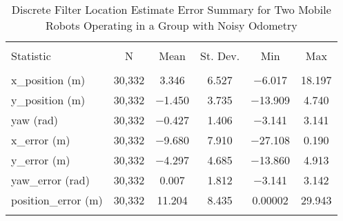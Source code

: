 
\begin{table}[!htbp] \centering 
  \caption{Discrete Filter Location Estimate Error Summary for Two Mobile Robots Operating in a Group with Noisy Odometry} 
  \label{tab:two_mobile_no_gps_discrete_summary} 
\begin{tabular}{@{\extracolsep{5pt}}lccccc} 
\\[-1.8ex]\hline 
\hline \\[-1.8ex] 
Statistic & \multicolumn{1}{c}{N} & \multicolumn{1}{c}{Mean} & \multicolumn{1}{c}{St. Dev.} & \multicolumn{1}{c}{Min} & \multicolumn{1}{c}{Max} \\ 
\hline \\[-1.8ex] 
x\_position (m) & 30,332 & \num{3.346} & \num{6.527} & \num{-6.017} & \num{18.197} \\ 
y\_position (m) & 30,332 & \num{-1.450} & \num{3.735} & \num{-13.909} & \num{4.740} \\ 
yaw (rad) & 30,332 & \num{-0.427} & \num{1.406} & \num{-3.141} & \num{3.141} \\ 
x\_error (m) & 30,332 & \num{-9.680} & \num{7.910} & \num{-27.108} & \num{0.190} \\ 
y\_error (m) & 30,332 & \num{-4.297} & \num{4.685} & \num{-13.860} & \num{4.913} \\ 
yaw\_error (rad)& 30,332 & \num{0.007} & \num{1.812} & \num{-3.141} & \num{3.142} \\
position\_error (m) & 30,332 & \num{11.204} & \num{8.435} & \num{0.00002} & \num{29.943} \\  
\hline \\[-1.8ex] 
\end{tabular} 
\end{table} 
